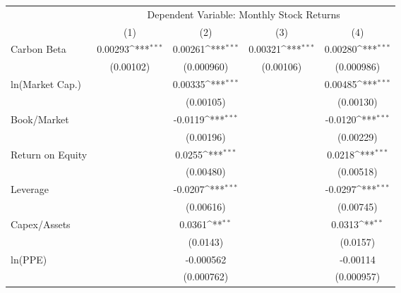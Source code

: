 {
\def\sym#1{\ifmmode^{#1}\else\(^{#1}\)\fi}
\begin{tabular}{l*{4}{c}}
\hline\hline
                    &\multicolumn{4}{c}{Dependent Variable: Monthly Stock Returns}                          \\\cmidrule(lr){2-5}
                    &\multicolumn{1}{c}{(1)}         &\multicolumn{1}{c}{(2)}         &\multicolumn{1}{c}{(3)}         &\multicolumn{1}{c}{(4)}         \\
\hline
Carbon Beta         &     0.00293\sym{***}&     0.00261\sym{***}&     0.00321\sym{***}&     0.00280\sym{***}\\
                    &   (0.00102)         &  (0.000960)         &   (0.00106)         &  (0.000986)         \\
ln(Market Cap.)     &                     &     0.00335\sym{***}&                     &     0.00485\sym{***}\\
                    &                     &   (0.00105)         &                     &   (0.00130)         \\
Book/Market         &                     &     -0.0119\sym{***}&                     &     -0.0120\sym{***}\\
                    &                     &   (0.00196)         &                     &   (0.00229)         \\
Return on Equity    &                     &      0.0255\sym{***}&                     &      0.0218\sym{***}\\
                    &                     &   (0.00480)         &                     &   (0.00518)         \\
Leverage            &                     &     -0.0207\sym{***}&                     &     -0.0297\sym{***}\\
                    &                     &   (0.00616)         &                     &   (0.00745)         \\
Capex/Assets        &                     &      0.0361\sym{**} &                     &      0.0313\sym{**} \\
                    &                     &    (0.0143)         &                     &    (0.0157)         \\
ln(PPE)             &                     &   -0.000562         &                     &    -0.00114         \\
                    &                     &  (0.000762)         &                     &  (0.000957)         \\

\end{tabular}}
